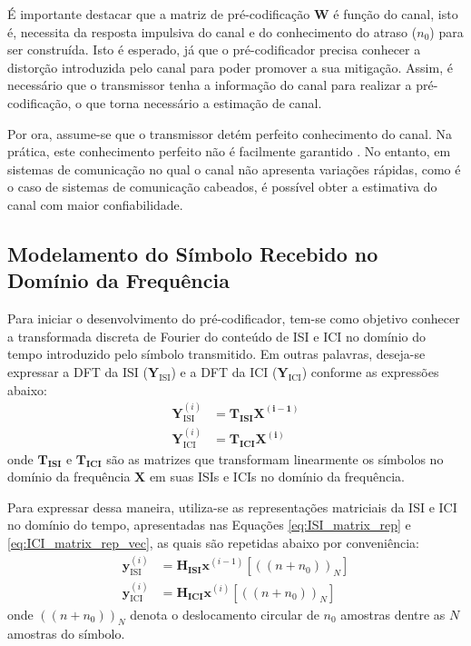 É importante destacar que a matriz de pré-codificação $\mathbf{W}$ é função do canal, isto é, necessita da resposta impulsiva do canal e do conhecimento do atraso ($n_0$) para ser construída. Isto é esperado, já que o pré-codificador precisa conhecer a distorção introduzida pelo canal para poder promover a sua mitigação. Assim, é necessário que o transmissor tenha a informação do canal para realizar a pré-codificação, o que torna necessário a estimação de canal.

Por ora, assume-se que o transmissor detém perfeito conhecimento do canal. Na prática, este conhecimento perfeito não é facilmente garantido \cite{malkin2009}. No entanto, em sistemas de comunicação no qual o canal não apresenta variações rápidas, como é o caso de sistemas de comunicação cabeados, é possível obter a estimativa do canal com maior confiabilidade. 

\subsection{Modelamento do Símbolo Recebido no Domínio da Frequência}

Para iniciar o desenvolvimento do pré-codificador, tem-se como objetivo conhecer a transformada discreta de Fourier do conteúdo de ISI e ICI no domínio do tempo introduzido pelo símbolo transmitido. Em outras palavras, deseja-se expressar a DFT da ISI ($\mathbf{Y}_\text{ISI}$) e a DFT da ICI ($\mathbf{Y}_\text{ICI}$) conforme as expressões abaixo:
\begin{align}
\mathbf{Y}_\text{ISI}^{(i)} &=\mathbf{ T_\text{ISI}}\mathbf{X^{(i-1)}} \label{eq:ISI_Tisi}\\
\mathbf{Y}_\text{ICI}^{(i)} &=\mathbf{ T_\text{ICI}\mathbf{X^{(i)}}} \label{eq:ISI_Tici}
\end{align}
onde $\mathbf{ T_\text{ISI}}$ e $\mathbf{ T_\text{ICI}}$ são as matrizes que transformam linearmente os símbolos no domínio da frequência $\mathbf{X}$ em suas ISIs e ICIs no domínio da frequência. 

Para expressar dessa maneira, utiliza-se as representações matriciais da ISI e ICI no domínio do tempo, apresentadas nas Equações \ref{eq:ISI_matrix_rep} e \ref{eq:ICI_matrix_rep_vec}, as quais são repetidas abaixo por conveniência:
\begin{align}
\mathbf{y}_\text{ISI}^{(i)} &= \mathbf{ H_\text{ISI}} \mathbf{x}^{(i-1)}[((n + n_0))_N] \nonumber\\
\mathbf{y}_\text{ICI}^{(i)} &= \mathbf{ H_\text{ICI}} \mathbf{x}^{(i)}[((n + n_0))_N] \nonumber
\end{align}
onde $((n + n_0))_N$ denota o deslocamento circular de $n_0$ amostras dentre as $N$ amostras do símbolo.

